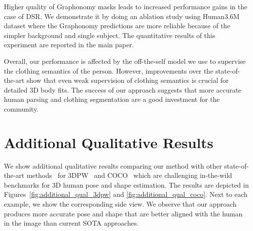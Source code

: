 \documentclass[10pt,twocolumn,letterpaper]{article}
\newcommand{\modelname}[0]{DSR\xspace}
\begin{document}
Higher quality of Graphonomy masks leads to increased performance gains in the case of \modelname. We demonstrate it by doing an ablation study using Human3.6M~\cite{h36m_pami} dataset where the Graphonomy predictions are more reliable because of the simpler background and single subject. The quantitative results of this experiment are reported in the main paper.

Overall, our performance is affected by the off-the-self model we use to supervise the clothing semantics of the person. However, improvements over the state-of-the-art show that even weak supervision of clothing semantics is crucial for detailed 3D body fits.
The success of our approach suggests that more accurate human parsing and clothing segmentation are a good investment for the community.

\section{Additional Qualitative Results}
We show additional qualitative results comparing our method with other state-of-the-art methods~\cite{spin, eft} for 3DPW~\cite{Li20143DHP} and COCO~\cite{coco} which are challenging in-the-wild benchmarks for 3D human pose and shape estimation. The results are depicted in Figures~\ref{fig:additional_qual_3dpw} and \ref{fig:additional_qual_coco}. Next to each example, we show the corresponding side view. We observe that our approach produces more accurate pose and shape that are better aligned with the human in the image than current SOTA approaches. 
\end{document}
